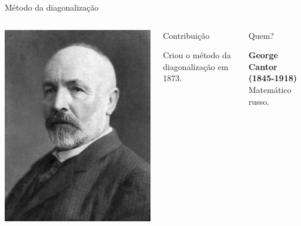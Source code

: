 \documentclass[xcolor=dvipsnames,table]{beamer}
\begin{document}
	\begin{frame}{Método da diagonalização}
		\begin{columns}
		  		\begin{center}
		    		\includegraphics[height=.6\textheight]{images/cantor.jpg}
		  		\end{center}
				\begin{block}{Contribuição}
					\begin{center}
						{\large Criou o método da diagonalização em 1873.}
					\end{center}
				\end{block}		  		
		  		\begin{block}{Quem?}
		  			\begin{center}
						{\bf George Cantor (1845-1918)} \\ Matemático russo.
					\end{center}
				\end{block}
		\end{columns}
	\end{frame}
	
\end{document}
